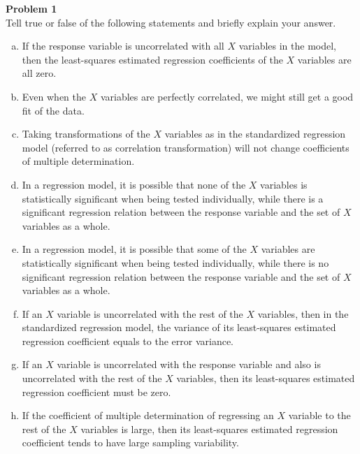 \documentclass{article}
\newenvironment{problem}[2][Problem]
    { \begin{mdframed}[backgroundcolor=gray!20] \textbf{#1 #2} \\}
    {  \end{mdframed}}
\begin{document}
\begin{problem}{1}
Tell true or false of the following statements and briefly explain your answer.
\begin{enumerate}[(a)]
\item If the response variable is uncorrelated with all $X$ variables in the model, then the
least-squares estimated regression coefficients of the $X$ variables are all zero.
\item Even when the $X$ variables are perfectly correlated, we might still get a good fit of
the data.
\item Taking transformations of the $X$ variables as in the standardized regression model (referred to as correlation transformation) will not change coefficients of multiple determination.
\item In a regression model, it is possible that none of the $X$ variables is statistically significant when being tested individually, while there is a significant regression relation between the response variable and the set of $X$ variables as a whole.
\item In a regression model, it is possible that some of the $X$ variables are statistically significant when being tested individually, while there is no significant regression relation between the response variable and the set of $X$ variables as a whole.
\item If an $X$ variable is uncorrelated with the rest of the $X$ variables, then in the standardized regression model, the variance of its least-squares estimated regression coefficient equals to the error variance.
\item If an $X$ variable is uncorrelated with the response variable and also is uncorrelated with the rest of the $X$ variables, then its least-squares estimated regression coefficient must be zero.
\item If the coefficient of multiple determination of regressing an $X$ variable to the rest of the $X$ variables is large, then its least-squares estimated regression coefficient tends to have large sampling variability.
\end{enumerate}
\end{problem}
\end{document}
